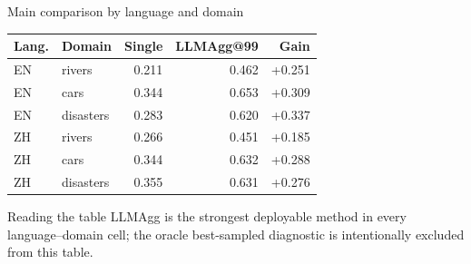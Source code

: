 \documentclass[aspectratio=169,10pt]{beamer}
\begin{document}
\begin{frame}{Main comparison by language and domain}
  \small
  \begin{center}
  \color{ink}
  \begin{tabular}{@{}llrrr@{}}
    \toprule
    \textbf{Lang.} & \textbf{Domain} & \textbf{Single} & \textbf{LLMAgg@99} & \textbf{Gain}\\
    \midrule
    EN & rivers    & 0.211 & 0.462 & +0.251\\
    EN & cars      & 0.344 & 0.653 & +0.309\\
    EN & disasters & 0.283 & 0.620 & +0.337\\
    \midrule
    ZH & rivers    & 0.266 & 0.451 & +0.185\\
    ZH & cars      & 0.344 & 0.632 & +0.288\\
    ZH & disasters & 0.355 & 0.631 & +0.276\\
    \bottomrule
  \end{tabular}
  \end{center}
  \vspace{8pt}
  \begin{block}{Reading the table}
    \small LLMAgg is the strongest deployable method in every language--domain cell; the oracle best-sampled diagnostic is intentionally excluded from this table.
  \end{block}
\end{frame}
\end{document}
